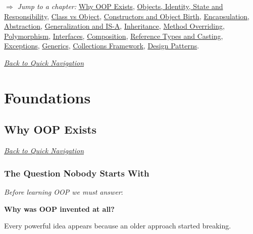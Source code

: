 \documentclass[11pt,a4paper]{book}
\begin{document}
\noindent
\textcolor{RosettaRoyalPurple}{$\Rightarrow$}
\emph{Jump to a chapter: }
\hyperref[chap:why_oop]{Why OOP Exists},
\hyperref[chap:objects_identity]{Objects, Identity, State and Responsibility},
\hyperref[chap:class_vs_object]{Class vs Object},
\hyperref[chap:constructors]{Constructors and Object Birth},
\hyperref[chap:encapsulation]{Encapsulation},
\hyperref[chap:abstraction]{Abstraction},
\hyperref[chap:generalization]{Generalization and IS-A},
\hyperref[chap:inheritance]{Inheritance},
\hyperref[chap:method_overriding]{Method Overriding},
\hyperref[chap:polymorphism]{Polymorphism},
\hyperref[chap:interfaces]{Interfaces},
\hyperref[chap:composition]{Composition},
\hyperref[chap:casting]{Reference Types and Casting},
\hyperref[chap:exceptions]{Exceptions},
\hyperref[chap:generics]{Generics},
\hyperref[chap:collections]{Collections Framework},
\hyperref[chap:patterns]{Design Patterns}.

\smallskip
\noindent
\hyperref[sec:quick_nav]{\emph{Back to Quick Navigation}}


\part{Foundations}

\chapter{Why OOP Exists}\label{chap:why_oop}

\smallskip
\noindent
\hyperref[sec:quick_nav]{\emph{Back to Quick Navigation}}


\section{The Question Nobody Starts With}

\begin{idea}
\emph{Before learning OOP we must answer}:

\textbf{Why was OOP invented at all?}

Every powerful idea appears because an older approach
started breaking.
\end{idea}
\end{document}
